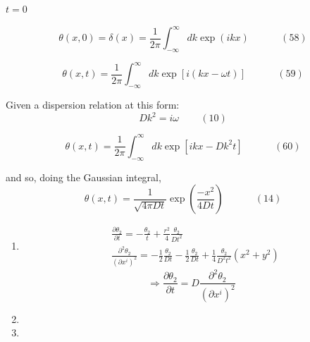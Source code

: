 $t=0$ 

\begin{equation}
  \theta(x,0) = \delta(x) = \frac{1}{2\pi} \int_{-\infty}^{\infty} dk \exp{ (ikx)} \quad \quad \quad \, (58) 
\end{equation}

\begin{equation}
  \theta(x,t) = \frac{1}{2\pi} \int_{-\infty}^{\infty} dk \exp{ [ i (kx-\omega t) ]} \quad \quad \quad \, (59) 
\end{equation}

Given a dispersion relation at this form:
\begin{equation}
  Dk^2  = i \omega \quad \quad \, (10)
\end{equation}

\begin{equation}
\theta(x,t) = \frac{1}{2\pi} \int_{-\infty}^{\infty} dk \exp{ [ ikx - Dk^2 t] } \quad \quad \quad \, (60)
\end{equation}

and so, doing the Gaussian integral,
\begin{equation}
  \theta(x,t) = \frac{1}{ \sqrt{ 4\pi Dt} } \exp{ \left( \frac{-x^2}{ 4Dt } \right)} \quad \quad \quad \, (14)
\end{equation}



\begin{enumerate}
\item[(a)] \[
\begin{aligned}
  & \frac{ \partial \theta_2}{ \partial t} = - \frac{ \theta_2}{t} + \frac{r^2}{4} \frac{ \theta_2}{ Dt^2 } \\ 
  & \frac{ \partial^2\theta_2}{ (\partial x^i)^2} = - \frac{1}{2} \frac{ \theta_2}{Dt} - \frac{1}{2} \frac{\theta_2}{ Dt} + \frac{1}{4} \frac{ \theta_2}{ D^2 t^2} (x^2+ y^2) 
\end{aligned}
\]
\[
\Longrightarrow \frac{ \partial \theta_2}{ \partial t} = D \frac{ \partial^2 \theta_2}{ (\partial x^i)^2 }
\]
\item[(b)]
\item[(c)]
\end{enumerate}

